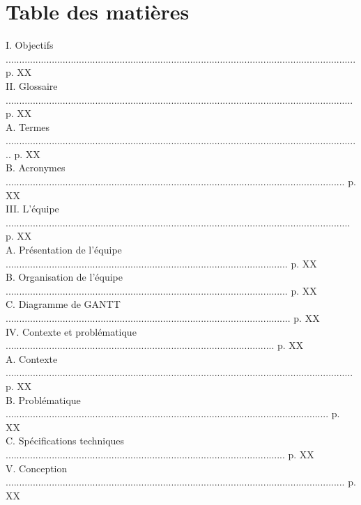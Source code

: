 \documentclass[a4paper,11pt]{book}
\begin{document}
	
	
	\maketitle
\section*{Table des matières}
I. Objectifs ................................................................................................................................. p. XX\\
II. Glossaire ................................................................................................................................ p. XX\\
A. Termes ................................................................................................................................... p. XX\\
B. Acronymes ............................................................................................................................. p. XX\\
III. L'équipe ............................................................................................................................... p. XX\\
A. Présentation de l'équipe ........................................................................................................ p. XX\\
B. Organisation de l'équipe ........................................................................................................ p. XX\\
C. Diagramme de GANTT ......................................................................................................... p. XX\\
IV. Contexte et problématique ................................................................................................... p. XX\\
A. Contexte ................................................................................................................................ p. XX\\
B. Problématique ....................................................................................................................... p. XX\\
C. Spécifications techniques ....................................................................................................... p. XX\\
V. Conception ............................................................................................................................. p. XX\\
\end{document}
